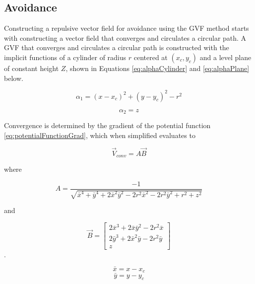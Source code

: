 \documentclass[conf]{new-aiaa}
\begin{document}
\subsection{Avoidance}

Constructing a repulsive vector field for avoidance using the GVF method starts with constructing a vector field that converges and circulates a circular path. A GVF that converges and circulates a circular path is constructed with the implicit functions of a cylinder of radius $r$ centered at $(x_c,y_c)$ and a level plane of constant height $Z$, shown in Equations \ref{eq:alphaCylinder} and \ref{eq:alphaPlane} below.

\begin{equation}\label{eq:alphaCylinder}
\alpha_1 = (x-x_c)^2 + (y-y_c)^2-r^2
\end{equation}

\begin{equation}\label{eq:alphaPlane}
\alpha_2 = z
\end{equation}

Convergence is determined by the gradient of the potential function \ref{eq:potentialFunctionGrad}, which when simplified evaluates to

\begin{equation}
\overrightarrow{V}_{conv} = A\overrightarrow{B}
\end{equation}

where


\begin{equation}
A = \dfrac{-1}{\sqrt{\bar{x}^4+\bar{y}^4+2\bar{x}^2\bar{y}^2-2r^2\bar{x}^2-2r^2\bar{y}^2+r^2+z^2}}
\end{equation}

and

\begin{equation}
\overrightarrow{B} = \begin{bmatrix} 2\bar{x}^3+2\bar{x}\bar{y}^2-2r^2\bar{x} \\ 2\bar{y}^3+2\bar{x}^2\bar{y}-2r^2\bar{y} \\z \end{bmatrix}
\end{equation}.




\begin{equation}
\bar{x} = x - x_c
\end{equation}
\begin{equation}
\bar{y} = y - y_c
\end{equation}
\end{document}
